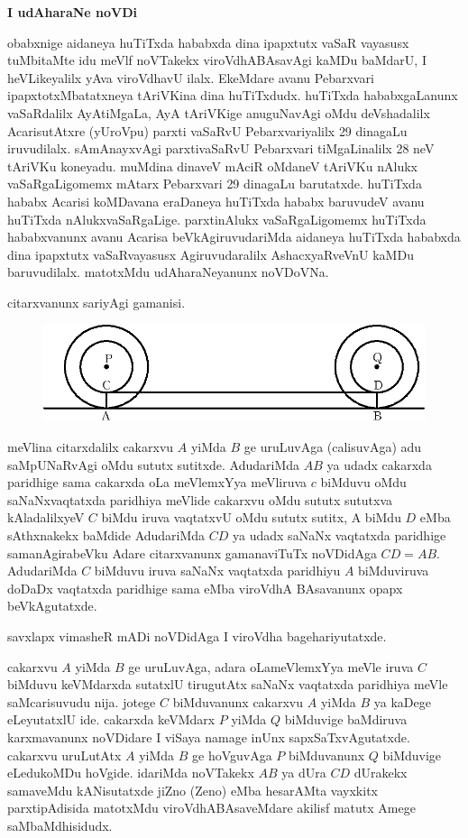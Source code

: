 {\bf I udAharaNe noVDi}

obabxnige aidaneya huTiTxda hababxda dina ipapxtutx vaSaR vayasusx tuMbitaMte idu meVlf noVTakekx viroVdhABAsavAgi kaMDu baMdarU, I heVLikeyalilx yAva viroVdhavU ilalx. EkeMdare avanu Pebarxvari ipapxtotxMbatatxneya tAriVKina dina huTiTxdudx. huTiTxda hababxgaLanunx vaSaRdalilx AyAtiMgaLa, AyA tAriVKige anuguNavAgi oMdu deVshadalilx AcarisutAtxre (yUroVpu) parxti vaSaRvU Pebarxvariyalilx {\rm 29} dinagaLu iruvudilalx. sAmAnayxvAgi parxtivaSaRvU Pebarxvari tiMgaLinalilx {\rm 28} neV tAriVKu koneyadu. muMdina dinaveV mAciR oMdaneV tAriVKu nAlukx vaSaRgaLigomemx mAtarx Pebarxvari {\rm 29} dinagaLu barutatxde. huTiTxda hababx Acarisi koMDavana eraDaneya huTiTxda hababx baruvudeV avanu huTiTxda nAlukxvaSaRgaLige. parxtinAlukx vaSaRgaLigomemx huTiTxda hababxvanunx avanu Acarisa beVkAgiruvudariMda aidaneya huTiTxda hababxda dina ipapxtutx vaSaRvayasusx Agiruvudaralilx AshacxyaRveVnU kaMDu baruvudilalx. matotxMdu udAharaNeyanunx noVDoVNa.

citarxvanunx sariyAgi gamanisi.
\begin{figure}[H]
\centering
\includegraphics{src/figures/083.eps}
\end{figure}

meVlina citarxdalilx cakarxvu $A$ yiMda $B$ ge uruLuvAga (calisuvAga) adu saMpUNaRvAgi oMdu sututx sutitxde. AdudariMda $AB$ ya udadx cakarxda paridhige sama cakarxda oLa meVlemxYya meVliruva $c$ biMduvu oMdu saNaNxvaqtatxda paridhiya meVlide cakarxvu oMdu sututx sututxva kAladalilxyeV $C$ biMdu iruva vaqtatxvU oMdu sututx sutitx, A biMdu $D$ eMba sAthxnakekx baMdide AdudariMda $CD$ ya udadx saNaNx vaqtatxda paridhige samanAgirabeVku Adare citarxvanunx gamanaviTuTx noVDidAga $CD=AB$. AdudariMda $C$ biMduvu iruva saNaNx vaqtatxda paridhiyu $A$ biMduviruva doDaDx vaqtatxda paridhige sama eMba viroVdhA BAsavanunx opapx beVkAgutatxde.

savxlapx vimasheR mADi noVDidAga I viroVdha bagehariyutatxde.

cakarxvu $A$ yiMda $B$ ge uruLuvAga, adara oLameVlemxYya meVle iruva $C$ biMduvu keVMdarxda sutatxlU tirugutAtx saNaNx vaqtatxda paridhiya meVle saMcarisuvudu nija. jotege $C$ biMduvanunx cakarxvu $A$ yiMda $B$ ya kaDege eLeyutatxlU ide. cakarxda keVMdarx $P$ yiMda $Q$ biMduvige baMdiruva karxmavanunx noVDidare I viSaya namage inUnx sapxSaTxvAgutatxde. cakarxvu uruLutAtx $A$ yiMda $B$ ge hoVguvAga $P$ biMduvanunx $Q$ biMduvige eLedukoMDu hoVgide. idariMda noVTakekx $AB$ ya dUra $CD$ dUrakekx samaveMdu kANisutatxde jiZno {\rm (Zeno)} eMba hesarAMta vayxkitx parxtipAdisida matotxMdu viroVdhABAsaveMdare akilisf matutx Amege saMbaMdhisidudx.

